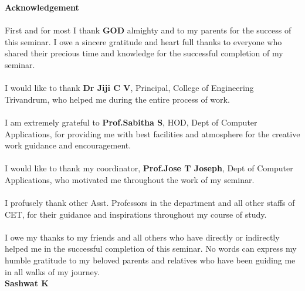\begin{titlepage}
\begin{center}
\textbf{\LARGE{Acknowledgement}}\\[0.5cm] 
\end{center}
\paragraph{\hspace{1cm}}
First and for most I thank \textbf{GOD} almighty and to my parents for the success of this seminar. I owe a sincere gratitude and heart full thanks to everyone who shared their precious time and knowledge for the successful completion of my seminar.
\paragraph{\hspace{1cm}}
I would like to thank \textbf{Dr Jiji C V}, Principal,  College of Engineering Trivandrum, who helped me during the entire process of work.
\paragraph{\hspace{1cm}}
I am extremely grateful to \textbf{Prof.Sabitha S}, HOD, Dept of Computer Applications, for providing me with best facilities and atmosphere for the creative work guidance and encouragement.
\paragraph{\hspace{1cm}}
I would like to thank my coordinator,\textbf{ Prof.Jose T Joseph}, Dept of Computer Applications, who motivated me throughout the work of my seminar.  
\paragraph{\hspace{1cm}}
I profusely thank other Asst. Professors in the department and all other staffs of CET, for their guidance and inspirations throughout my course of study.
\paragraph{\hspace{1cm}}
I owe my thanks to my friends and all others who have directly or indirectly helped me in the successful completion of this seminar. No words can express my humble gratitude to my beloved parents and relatives who have been guiding me in all walks of my journey.\\

 \vspace{1.1cm}
\hspace{345pt} \textbf{Sashwat K}


\end{titlepage}
